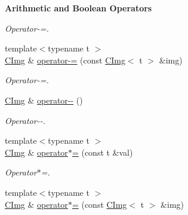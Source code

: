 \begin{Indent}{\bf Arithmetic and Boolean Operators}
\begin{DoxyCompactItemize}
\begin{DoxyCompactList}\small\item\em Operator-\/=. \item\end{DoxyCompactList}\item 
\hypertarget{structcimg__library_1_1_c_img_a3c221210ff5ba75e6a4f761dfb11db7f}{
{\footnotesize template$<$typename t $>$ }\\\hyperlink{structcimg__library_1_1_c_img}{CImg} \& \hyperlink{structcimg__library_1_1_c_img_a3c221210ff5ba75e6a4f761dfb11db7f}{operator-\/=} (const \hyperlink{structcimg__library_1_1_c_img}{CImg}$<$ t $>$ \&img)}
\label{structcimg__library_1_1_c_img_a3c221210ff5ba75e6a4f761dfb11db7f}

\begin{DoxyCompactList}\small\item\em Operator-\/=. \item\end{DoxyCompactList}\item 
\hypertarget{structcimg__library_1_1_c_img_a312219826827d9125d3a06a9d78121bc}{
\hyperlink{structcimg__library_1_1_c_img}{CImg} \& \hyperlink{structcimg__library_1_1_c_img_a312219826827d9125d3a06a9d78121bc}{operator-\/-\/} ()}
\label{structcimg__library_1_1_c_img_a312219826827d9125d3a06a9d78121bc}

\begin{DoxyCompactList}\small\item\em Operator-\/-\/. \item\end{DoxyCompactList}\item 
\hypertarget{structcimg__library_1_1_c_img_ac792a92308c97086185e652c5469dcfd}{
{\footnotesize template$<$typename t $>$ }\\\hyperlink{structcimg__library_1_1_c_img}{CImg} \& \hyperlink{structcimg__library_1_1_c_img_ac792a92308c97086185e652c5469dcfd}{operator$\ast$=} (const t \&val)}
\label{structcimg__library_1_1_c_img_ac792a92308c97086185e652c5469dcfd}

\begin{DoxyCompactList}\small\item\em Operator$\ast$=. \item\end{DoxyCompactList}\item 
\hypertarget{structcimg__library_1_1_c_img_a62006865196bcde56285a8e5c85d7185}{
{\footnotesize template$<$typename t $>$ }\\\hyperlink{structcimg__library_1_1_c_img}{CImg} \& \hyperlink{structcimg__library_1_1_c_img_a62006865196bcde56285a8e5c85d7185}{operator$\ast$=} (const \hyperlink{structcimg__library_1_1_c_img}{CImg}$<$ t $>$ \&img)}
\label{structcimg__library_1_1_c_img_a62006865196bcde56285a8e5c85d7185}


\end{DoxyCompactItemize}
\end{Indent}

